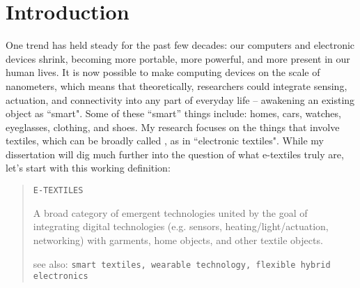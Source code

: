 \chapter{Introduction}
\label{ch-intro}

\setlength{\parindent}{0.5in}

\par
One trend has held steady for the past few decades: our computers and electronic devices shrink, becoming more portable, more powerful, and more present in our human lives. It is now possible to make computing devices on the scale of nanometers, which means that theoretically, researchers could integrate sensing, actuation, and connectivity into any part of everyday life -- awakening an existing object as ``smart". Some of these ``smart'' things include: homes, cars, watches, eyeglasses, clothing, and shoes. My research focuses on the things that involve textiles, which can be broadly called , as in ``electronic textiles". 
While my dissertation will dig much further into the question of what e-textiles truly are, let's start with this working definition:

\begin{quote}
  \texttt{E-TEXTILES}

  A broad category of emergent technologies united by the goal of integrating digital technologies (e.g. sensors, heating/light/actuation, networking) with garments, home objects, and other textile objects.

  see also: \texttt{smart textiles, wearable technology, flexible hybrid electronics}
\end{quote}

\par
{}


